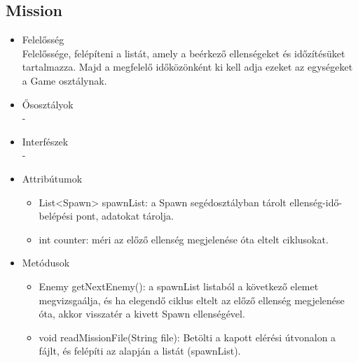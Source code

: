 \subsection{Mission}
\begin{itemize}
\item Felelősség\\
Felelőssége, felépíteni a listát, amely a beérkező ellenségeket és időzítésüket tartalmazza. Majd a megfelelő időközönként ki kell adja ezeket az egységeket a Game osztálynak.
\item Ősosztályok\\
-
\item Interfészek\\
-
\item Attribútumok\\
	\begin{itemize}
		\item List<Spawn> spawnList: a Spawn segédosztályban tárolt ellenség-idő-belépési pont, adatokat tárolja.
		\item int counter: méri az előző ellenség megjelenése óta eltelt ciklusokat.
	\end{itemize}
\item Metódusok\\
	\begin{itemize}
		\item Enemy getNextEnemy(): a spawnList listaból a következő elemet megvizsgaálja, és ha elegendő ciklus eltelt az előző ellenség megjelenése óta, akkor visszatér a kivett Spawn ellenségével.
		\item void readMissionFile(String file): Betölti a kapott elérési útvonalon a fájlt, és felépíti az alapján a listát (spawnList).
	\end{itemize}
\end{itemize}


